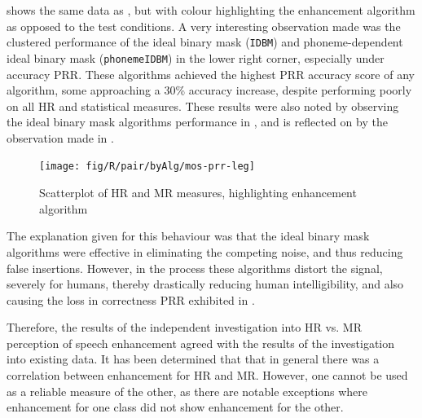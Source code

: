  shows the same data as ,
but with colour highlighting the enhancement algorithm as opposed
to the test conditions. A very interesting observation made was the
clustered performance of the ideal binary mask (\lstinline!IDBM!)
and phoneme-dependent ideal binary mask (\lstinline!phonemeIDBM!)
in the lower right corner, especially under accuracy \ac{PRR}. These
algorithms achieved the highest \ac{PRR} accuracy score of any algorithm,
some approaching a 30\% accuracy increase, despite performing poorly
on all \ac{HR} and statistical measures. These results were also
noted by observing the ideal binary mask algorithms performance in
, and is reflected on by the
observation made in .

\begin{figure}[h]

\noindent \begin{centering}
\texttt{[image: fig/R/pair/byAlg/mos-prr-leg]}
\par\end{centering}

\protect\caption{\label{fig:hr-mr-alg}Scatterplot of \acs{HR} and \acs{MR} measures,
highlighting enhancement algorithm}
\end{figure}


The explanation given for this behaviour was that the ideal binary
mask algorithms were effective in eliminating the competing noise,
and thus reducing false insertions. However, in the process these
algorithms distort the signal, severely for humans, thereby drastically
reducing human intelligibility, and also causing the loss in correctness
\ac{PRR} exhibited in .

Therefore, the results of the independent investigation into \ac{HR}
vs. \ac{MR} perception of speech enhancement agreed with the results
of the investigation into existing data. It has been determined that
that in general there was a correlation between enhancement for \ac{HR}
and \ac{MR}. However, one cannot be used as a reliable measure of
the other, as there are notable exceptions where enhancement for one
class did not show enhancement for the other.


